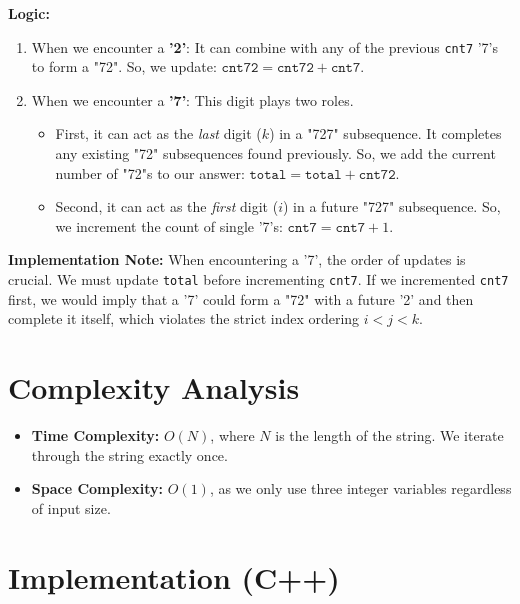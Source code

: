 \documentclass[11pt]{article}
\begin{document}
\textbf{Logic:}
\begin{enumerate}
    \item When we encounter a \textbf{'2'}:
    It can combine with any of the previous \texttt{cnt7} '7's to form a "72".
    So, we update: $\texttt{cnt72} = \texttt{cnt72} + \texttt{cnt7}$.
    
    \item When we encounter a \textbf{'7'}:
    This digit plays two roles.
    \begin{itemize}
        \item First, it can act as the \textit{last} digit ($k$) in a "727" subsequence. It completes any existing "72" subsequences found previously. So, we add the current number of "72"s to our answer: $\texttt{total} = \texttt{total} + \texttt{cnt72}$.
        \item Second, it can act as the \textit{first} digit ($i$) in a future "727" subsequence. So, we increment the count of single '7's: $\texttt{cnt7} = \texttt{cnt7} + 1$.
    \end{itemize}
\end{enumerate}

\textbf{Implementation Note:} When encountering a '7', the order of updates is crucial. We must update \texttt{total} before incrementing \texttt{cnt7}. If we incremented \texttt{cnt7} first, we would imply that a '7' could form a "72" with a future '2' and then complete it itself, which violates the strict index ordering $i < j < k$.

\section*{Complexity Analysis}
\begin{itemize}
    \item \textbf{Time Complexity:} $O(N)$, where $N$ is the length of the string. We iterate through the string exactly once.
    \item \textbf{Space Complexity:} $O(1)$, as we only use three integer variables regardless of input size.
\end{itemize}

\section*{Implementation (C++)}
\end{document}
